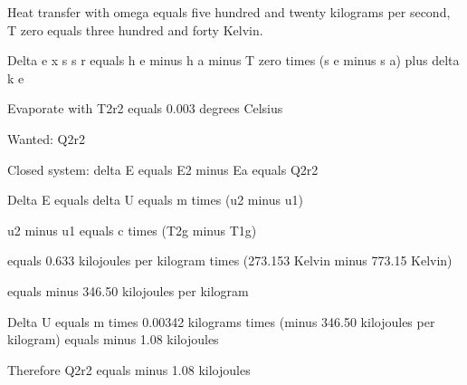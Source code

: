 Heat transfer with omega equals five hundred and twenty kilograms per second, T zero equals three hundred and forty Kelvin.

Delta e x s s r equals h e minus h a minus T zero times (s e minus s a) plus delta k e

Evaporate with T2r2 equals 0.003 degrees Celsius

Wanted: Q2r2

Closed system: delta E equals E2 minus Ea equals Q2r2

Delta E equals delta U equals m times (u2 minus u1)

u2 minus u1 equals c times (T2g minus T1g)

equals 0.633 kilojoules per kilogram times (273.153 Kelvin minus 773.15 Kelvin)

equals minus 346.50 kilojoules per kilogram

Delta U equals m times 0.00342 kilograms times (minus 346.50 kilojoules per kilogram) equals minus 1.08 kilojoules

Therefore Q2r2 equals minus 1.08 kilojoules